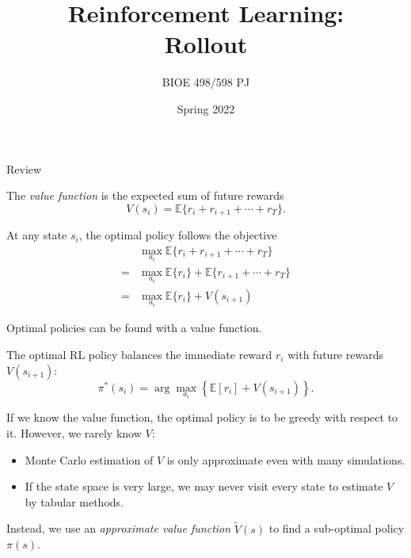 \documentclass[9pt]{beamer}
\title{Reinforcement Learning:\\Rollout}
\author{BIOE 498/598 PJ}
\date{Spring 2022}
\newcommand\pskip{\pause\bigskip}
\begin{document}
\frame{\titlepage}

\begin{frame}{Review}

The \emph{value function} is the expected sum of future rewards
\[ V(s_i) = \mathbb{E}\{ r_i + r_{i+1} + \cdots + r_T \}. \]

\bigskip
At any state $s_i$, the optimal policy follows the objective
\begin{align*} 
	 & \max_{a_i} \mathbb{E}\{ r_i + r_{i+1} + \cdots + r_T \} \\
	=& \max_{a_i} \mathbb{E}\{r_i\} + \mathbb{E}\{r_{i+1} + \cdots + r_T \} \\
	=& \max_{a_i} \mathbb{E}\{r_i\} + V(s_{i+1})
\end{align*}

\end{frame}

\begin{frame}{Optimal policies can be found with a value function.}

The optimal RL policy balances the immediate reward $r_i$ with future rewards $V(s_{i+1})$:
	\[ \pi^*(s_i) = \arg \max_{a_i}\left\{ \mathbb{E}[r_i] + V(s_{i+1}) \right\}. \]
	
\pskip
If we know the value function, the optimal policy is to be greedy with respect to it. However, we rarely know $V$:
\begin{itemize}
	\item Monte Carlo estimation of $V$ is only approximate even with many simulations.
	\item If the state space is very large, we may never visit every state to estimate $V$ by tabular methods.
\end{itemize}

\pskip
Instead, we use an \emph{approximate value function} $\widetilde{V}(s)$ to find a sub-optimal policy $\pi(s)$.
\end{frame}
\end{document}
